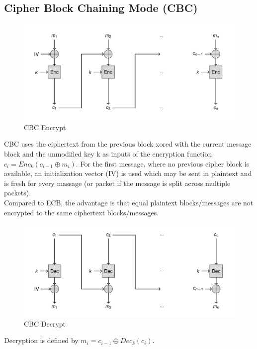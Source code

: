 \subsection{Cipher Block Chaining Mode (CBC)}
\begin{figure}[H]
  \centering
  \includegraphics[width=.8\textwidth]{figures/cbc_encrypt.png}
  \caption{CBC Encrypt}
\end{figure}
CBC uses the ciphertext from the previous block xored with the current message block and the unmodified key k as inputs of the encryption function $c_i = Enc_k(c_{i-1} \oplus m_i)$.
For the first message, where no previous cipher block is available, an initialization vector (IV) is used which may be sent in plaintext and is fresh for every massage (or packet if the message is split across multiple packets).\\
Compared to ECB, the advantage is that equal plaintext blocks/messages are not encrypted to the same ciphertext blocks/messages.
\begin{figure}[H]
  \centering
  \includegraphics[width=.8\textwidth]{figures/cbc_decrypt.png}
  \caption{CBC Decrypt}
\end{figure}
Decryption is defined by $m_i = c_{i-1} \oplus Dec_k(c_i)$.

